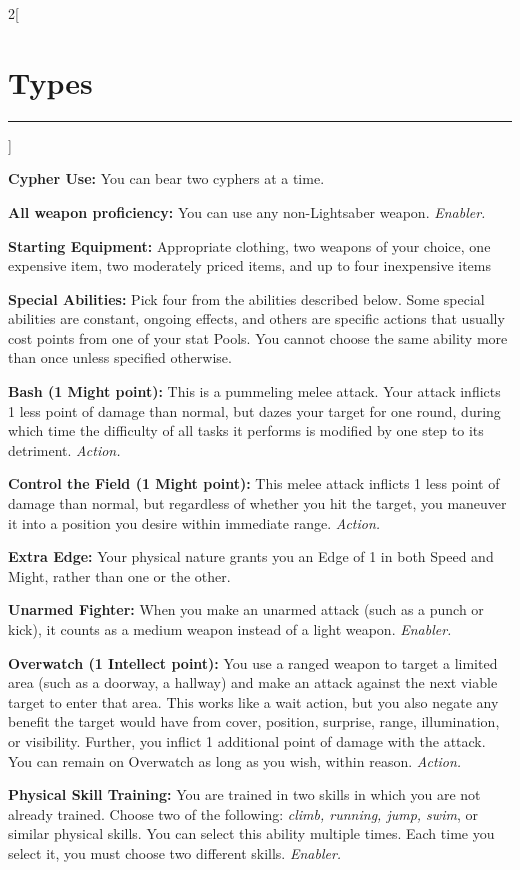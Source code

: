 \documentclass[a4paper,10pt,final]{book}
\newcommand{\HRule}{\rule{\linewidth}{0.5mm}} %
\newcommand{\newSection}[1]{\section*{#1} \addcontentsline{toc}{section}{#1} \label{sec:#1} \HRule}
\newcommand{\itemLine}[2]{\textbf{#1:} {#2}\par}
\newcommand{\itemAbility}[2]{\textcolor{25gray}{\textbullet\textbf{ #1:}} {#2}\par}
\newcommand{\enabler}{\textit{ Enabler.}}
\newcommand{\action}{\textit{ Action.}}
\newenvironment{docsection}[1]
{
  \begin{multicols*}{2}[\newSection{#1}]
}
{
  \end{multicols*}
  \newpage
}
\begin{document}
\begin{docsection}{Types}
\itemLine{Cypher Use} {You can bear two cyphers at a time.}

\itemLine{All weapon proficiency} {You can use any non-Lightsaber weapon.\enabler}

\itemLine{Starting Equipment} {Appropriate clothing, two weapons of your choice, one expensive item, two moderately priced items, and up to four inexpensive items}

\itemLine{Special Abilities} {Pick four from the abilities described below. Some special abilities are constant, ongoing effects, and others are specific actions that usually cost points from one of your stat Pools. You cannot choose the same ability more than once unless specified otherwise.}

\itemAbility{Bash (1 Might point)} {This is a pummeling melee attack. Your attack inflicts 1 less point of damage than normal, but dazes your target for one round, during which time the difficulty of all tasks it performs is modified by one step to its detriment.\action}

\itemAbility{Control the Field (1 Might point)} {This melee attack inflicts 1 less point of damage than normal, but regardless of whether you hit the target, you maneuver it into a position you desire within immediate range.\action}

\itemAbility{Extra Edge} {Your physical nature grants you an Edge of 1 in both Speed and Might, rather than one or the other.}

\itemAbility{Unarmed Fighter} {When you make an unarmed attack (such as a punch or kick), it counts as a medium weapon instead of a light weapon.\enabler}

\itemAbility{Overwatch (1 Intellect point)} {You use a ranged weapon to target a limited area (such as a doorway, a hallway) and make an attack against the next viable target to enter that area. This works like a wait action, but you also negate any benefit the target would have from cover, position, surprise, range, illumination, or visibility. Further, you inflict 1 additional point of damage with the attack. You can remain on Overwatch as long as you wish, within reason.\action}

\itemAbility{Physical Skill Training}{You are trained in two skills in which you are not already trained. Choose two of the following: \textit{climb, running, jump, swim}, or similar physical skills. You can select this ability multiple times. Each time you select it, you must choose two different skills.\enabler}


\end{docsection}
\end{document}
